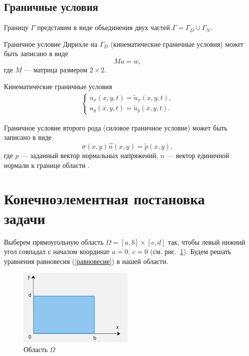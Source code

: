 \documentclass[12pt, a4paper]{article}
\begin{document}
	\subsection{Граничные условия}
	Границу $\Gamma$ представим в виде объединения двух частей $\Gamma=\Gamma_D\cup\Gamma_N$.
	
	Граничное условие Дирихле на $\Gamma_D$ (кинематические граничные условия) может быть записано в виде
	\[
	Mu=w,
	\]
	где $M$ --- матрица размером $2\times 2$.
	
Кинематические граничные условия
\begin{eqnarray}
	\begin{cases}
u_x(x,y,t)= \tilde u_x(x,y,t),\\
u_y(x,y,t)= \tilde u_y(x,y,t).
	\end{cases}
\label{kinem}
\end{eqnarray}

Граничное условие второго рода (силовое граничное условие) может быть записано в виде 
\begin{equation}
	\sigma(x,y)\vec n(x,y)=\tilde p(x,y),
	\label{silov}
\end{equation}
где $p$ --- заданный вектор нормальных напряжений, $n$ --- вектор единичной нормали к границе области \cite{galanin1}.


	\newpage
	\section{Конечноэлементная постановка задачи}
	Выберем прямоугольную область $\Omega=[a,b]\times[c,d]$ так, чтобы левый нижний угол совпадал с началом координат $a=0,\,c=0$ (см. рис.~\ref{p1}). Будем решать уравнения равновесия (\ref{равновесие}) в нашей области.
 	\begin{figure}[H]
 		\centering
		\includegraphics[width=0.5\textwidth]{p1}
		\caption{Область $\Omega$}
		\label{p1}
	 \end{figure}
	
\end{document}

